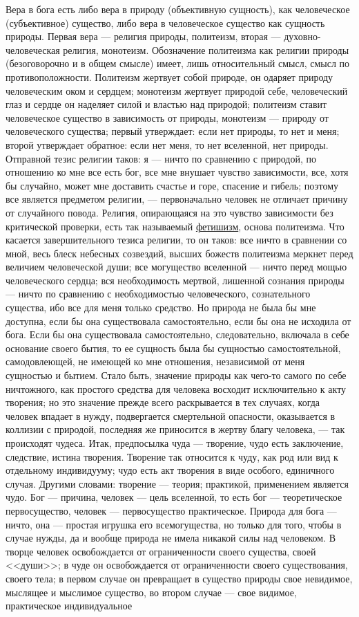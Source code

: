 \documentclass[12pt]{article}
\begin{document}
Вера в бога есть либо вера в природу (объективную сущность), как человеческое (субъективное) существо, либо вера в человеческое существо как сущность природы. Первая вера --- религия природы, политеизм, вторая --- духовно-человеческая религия, монотеизм. Обозначение политеизма как религии природы (безоговорочно и в общем смысле) имеет, лишь относительный смысл, смысл по противоположности. Политеизм жертвует собой природе, он одаряет природу человеческим оком и сердцем; монотеизм жертвует природой себе, человеческий глаз и сердце он наделяет силой и властью над природой; политеизм ставит человеческое существо в зависимость от природы, монотеизм --- природу от человеческого существа; первый утверждает: если нет природы, то нет и меня; второй утверждает обратное: если нет меня, то нет вселенной, нет природы. Отправной тезис религии таков: я --- ничто по сравнению с природой, по отношению ко мне все есть бог, все мне внушает чувство зависимости, все, хотя бы случайно, может мне доставить счастье и горе, спасение и гибель; поэтому все является предметом религии, --- первоначально человек не отличает причину от случайного повода. Религия, опирающаяся на это чувство зависимости без критической проверки, есть так называемый \underline{фетишизм}, основа политеизма. Что касается завершительного тезиса религии, то он таков: все ничто в сравнении со мной, весь блеск небесных созвездий, высших божеств политеизма меркнет перед величием человеческой души; все могущество вселенной --- ничто перед мощью человеческого сердца; вся необходимость мертвой, лишенной сознания природы --- ничто по сравнению с необходимостью человеческого, сознательного существа, ибо все для меня только средство. Но природа не была бы мне доступна, если бы она существовала самостоятельно, если бы она не исходила от бога. Если бы она существовала самостоятельно, следовательно, включала в себе основание своего бытия, то ее сущность была бы сущностью самостоятельной, самодовлеющей, не имеющей ко мне отношения, независимой от меня сущностью и бытием. Стало быть, значение природы как чего-то самого по себе ничтожного, как простого средства для человека восходит исключительно к акту творения; но это значение прежде всего раскрывается в тех случаях, когда человек впадает в нужду, подвергается смертельной опасности, оказывается в коллизии с природой, последняя же приносится в жертву благу человека, --- так происходят чудеса. Итак, предпосылка чуда --- творение, чудо есть заключение, следствие, истина творения. Творение так относится к чуду, как род или вид к отдельному индивидууму; чудо есть акт творения в виде особого, единичного случая. Другими словами: творение --- теория; практикой, применением является чудо. Бог --- причина, человек --- цель вселенной, то есть бог --- теоретическое первосущество, человек --- первосущество практическое. Природа для бога --- ничто, она --- простая игрушка его всемогущества, но только для того, чтобы в случае нужды, да и вообще природа не имела никакой силы над человеком. В творце человек освобождается от ограниченности своего существа, своей <<души>>; в чуде он освобождается от ограниченности своего существования, своего тела; в первом случае он превращает в существо природы свое невидимое, мыслящее и мыслимое существо, во втором случае --- свое видимое, практическое индивидуальное 
\end{document}
